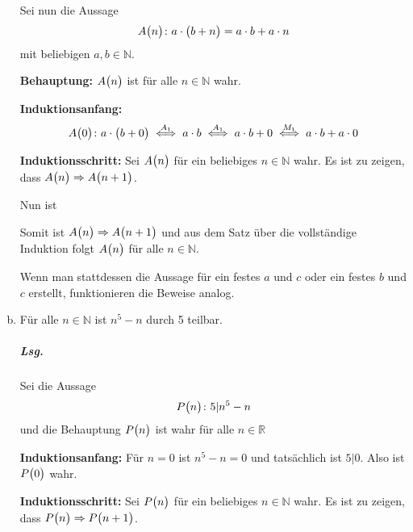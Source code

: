 \documentclass{scrreprt}
\begin{document}
\begin{enumerate}[(a)]
  Sei nun die Aussage
  \[
    A\qty\big(n) \colon a \cdot \qty\big(b + n) = a \cdot b + a \cdot n
  \]
  mit beliebigen $a, b \in \mathbb{N}$.

  \textbf{Behauptung:} $A\qty\big(n)$ ist für alle $n \in \mathbb{N}$ wahr.

  \textbf{Induktionsanfang:}
  \[
    A\qty\big(0) \colon a \cdot \qty\big(b + 0)
    \overset{A_1}\iff a \cdot b
    \overset{A_1}\iff a \cdot b + 0
    \overset{M_1}\iff a \cdot b + a \cdot 0
  \]

  \textbf{Induktionsschritt:} Sei $A\qty\big(n)$ für ein beliebiges
  $n \in \mathbb{N}$ wahr.
  Es ist zu zeigen, dass $A\qty\big(n) \Rightarrow A\qty\big(n + 1)$.

  Nun ist
  Somit ist $A\qty\big(n) \Rightarrow A\qty\big(n + 1)$ und aus dem Satz über die
  vollständige Induktion folgt $A\qty\big(n)$ für alle $n \in \mathbb{N}$.

  Wenn man stattdessen die Aussage für ein festes $a$ und $c$ oder ein festes
  $b$ und $c$ erstellt, funktionieren die Beweise analog.

\newpage
\item Für alle $n \in \mathbb{N}$ ist $n^5 - n$ durch 5 teilbar.

  \subparagraph{Lsg.} Sei die Aussage
  \[
    P\qty\big(n) \colon 5 | n^5 - n
  \]
  und die Behauptung $P\qty\big(n)$ ist wahr für alle $n \in \mathbb{R}$

  \textbf{Induktionsanfang:} Für $n = 0$ ist $n^5 - n = 0$ und tatsächlich ist
  $5 | 0$.
  Also ist $P\qty\big(0)$ wahr.

  \textbf{Induktionsschritt:} Sei $P\qty\big(n)$ für ein beliebiges
  $n \in \mathbb{N}$ wahr.
  Es ist zu zeigen, dass $P\qty\big(n) \Rightarrow P\qty\big(n + 1)$.


\end{enumerate}
\end{document}
